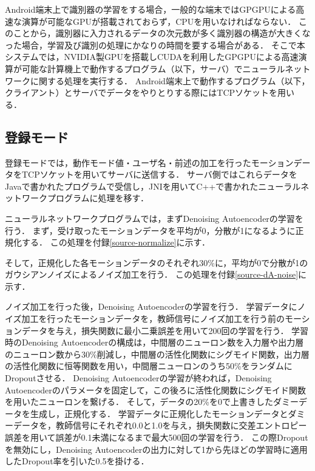 Android端末上で識別器の学習をする場合，一般的な端末ではGPGPUによる高速な演算が可能なGPUが搭載されておらず，CPUを用いなければならない．
このことから，識別器に入力されるデータの次元数が多く識別器の構造が大きくなった場合，学習及び識別の処理にかなりの時間を要する場合がある．
そこで本システムでは，NVIDIA製GPUを搭載しCUDA\cite{4-cuda}を利用したGPGPUによる高速演算が可能な計算機上で動作するプログラム（以下，サーバ）でニューラルネットワークに関する処理を実行する．
Android端末上で動作するプログラム（以下，クライアント）とサーバでデータをやりとりする際にはTCPソケットを用いる．

\subsection{登録モード}
登録モードでは，動作モード値・ユーザ名・前述の加工を行ったモーションデータをTCPソケットを用いてサーバに送信する．
サーバ側ではこれらデータをJavaで書かれたプログラムで受信し，JNI\cite{4-jni}を用いてC++で書かれたニューラルネットワークプログラムに処理を移す．

ニューラルネットワークプログラムでは，まずDenoising Autoencoderの学習を行う．
まず，受け取ったモーションデータを平均が0，分散が1になるように正規化する．
この処理を付録\ref{source-normalize}に示す．

そして，正規化した各モーションデータのそれぞれ30\%に，平均が0で分散が1のガウシアンノイズによるノイズ加工を行う．
この処理を付録\ref{source-dA-noise}に示す．

ノイズ加工を行った後，Denoising Autoencoderの学習を行う．
学習データにノイズ加工を行ったモーションデータを，教師信号にノイズ加工を行う前のモーションデータを与え，損失関数に最小二乗誤差を用いて200回の学習を行う．
学習時のDenoising Autoencoderの構成は，中間層のニューロン数を入力層や出力層のニューロン数から30\%削減し，中間層の活性化関数にシグモイド関数，出力層の活性化関数に恒等関数を用い，中間層ニューロンのうち50\%をランダムにDropoutさせる．
Denoising Autoencoderの学習が終われば，Denoising Autoencoderのパラメータを固定して，この後ろに活性化関数にシグモイド関数を用いたニューロンを繋げる．
そして，データの20\%を0で上書きしたダミーデータを生成し，正規化する．
学習データに正規化したモーションデータとダミーデータを，教師信号にそれぞれ0.0と1.0を与え，損失関数に交差エントロピー誤差を用いて誤差が0.1未満になるまで最大500回の学習を行う．
この際Dropoutを無効にし，Denoising Autoencoderの出力に対して1から先ほどの学習時に適用したDropout率を引いた0.5を掛ける．

